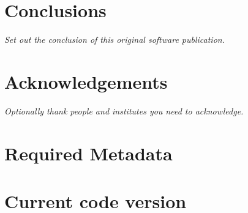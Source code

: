 \documentclass[preprint,12pt, a4paper]{elsarticle}
\begin{document}
\section{Conclusions}\label{sec:conclusions}

{\em Set out the conclusion of this original software publication.}


\section*{Acknowledgements}

{\em Optionally thank people and institutes you need to acknowledge. }




 



\section*{Required Metadata}\label{sec:metadata}


\section*{Current code version}\label{sec:src_version}
\end{document}
